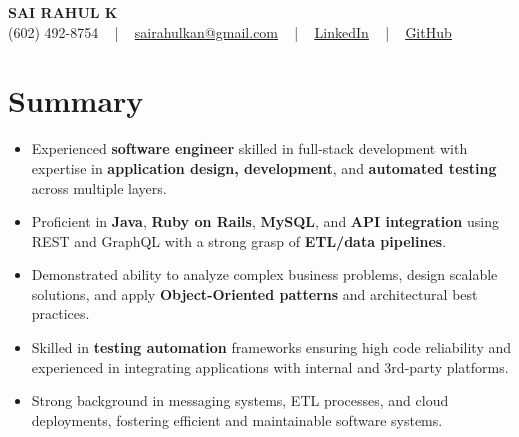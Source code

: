 \documentclass[letterpaper,11pt]{article}
\newcommand{\resumeItem}[1]{
  \item\footnotesize{
    {#1 \vspace{-2pt}}
  }
}
\newcommand{\resumeItemListStart}{\begin{itemize}[leftmargin=*]}
\newcommand{\resumeItemListEnd}{\end{itemize}\vspace{-5pt}}
\begin{document}
\begin{center}
    {\fontsize{14pt}{12pt}\selectfont \textbf{\MakeUppercase{Sai Rahul K}}}\\ \vspace{2pt}
    \fontsize{10pt}{12pt}\selectfont (602) 492-8754 ~ | ~ \href{mailto:sairahulkan@gmail.com}{sairahulkan@gmail.com} ~ | ~
    \href{https://www.linkedin.com/in/rq123/}{\color{blue}\underline{LinkedIn}} ~ | ~
    \href{https://github.com/kanrahuldo}{\color{blue}\underline{GitHub}}~
    \vspace{-8pt}
\end{center}

\section{Summary}
\fontsize{9pt}{10pt}\selectfont
\resumeItemListStart
    \resumeItem{Experienced \textbf{software engineer} skilled in full-stack development with expertise in \textbf{application design, development}, and \textbf{automated testing} across multiple layers.}
    \resumeItem{Proficient in \textbf{Java}, \textbf{Ruby on Rails}, \textbf{MySQL}, and \textbf{API integration} using REST and GraphQL with a strong grasp of \textbf{ETL/data pipelines}.}
    \resumeItem{Demonstrated ability to analyze complex business problems, design scalable solutions, and apply \textbf{Object-Oriented patterns} and architectural best practices.}
    \resumeItem{Skilled in \textbf{testing automation} frameworks ensuring high code reliability and experienced in integrating applications with internal and 3rd-party platforms.}
    \resumeItem{Strong background in messaging systems, ETL processes, and cloud deployments, fostering efficient and maintainable software systems.}
\resumeItemListEnd
\vspace{-6pt}
\end{document}
